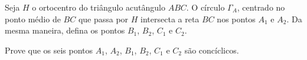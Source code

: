 Seja $H$ o ortocentro do triângulo acutângulo $ABC$. O círculo $\Gamma_{A}$, centrado no ponto médio de $BC$ que passa por $H$ intersecta a reta $BC$ nos pontos $A_{1}$ e $A_{2}$. Da mesma maneira, defina os pontos $B_{1}$, $B_{2}$, $C_{1}$ e $C_{2}$.

Prove que os seis pontos $A_{1}$, $ A_{2}$, $ B_{1}$, $ B_{2}$,  $ C_{1}$ e $ C_{2}$ são concíclicos.
